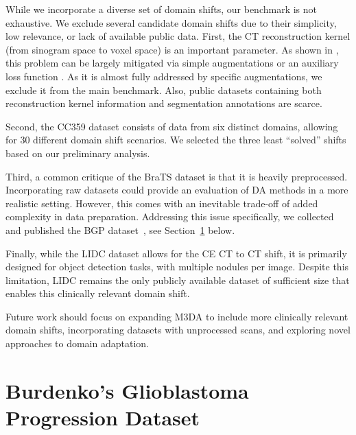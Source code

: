 While we incorporate a diverse set of domain shifts, our benchmark is not exhaustive. We exclude several candidate domain shifts due to their simplicity, low relevance, or lack of available public data. First, the CT reconstruction kernel (from sinogram space to voxel space) is an important parameter. As shown in \cite{saparov2021zero}, this problem can be largely mitigated via simple augmentations or an auxiliary loss function \cite{shimovolos2022adaptation}. As it is almost fully addressed by specific augmentations, we exclude it from the main benchmark. Also, public datasets containing both reconstruction kernel information and segmentation annotations are scarce.

Second, the CC359 dataset consists of data from six distinct domains, allowing for 30 different domain shift scenarios. We selected the three least ``solved'' shifts based on our preliminary analysis.%

Third, a common critique of the BraTS dataset is that it is heavily preprocessed. Incorporating raw datasets could provide an evaluation of DA methods in a more realistic setting. However, this comes with an inevitable trade-off of added complexity in data preparation. Addressing this issue specifically, we collected and published the BGP dataset~\cite{Zolotova2023Burdenko}, see Section~\ref{sec:da_bench:bgpd} below.


Finally, while the LIDC dataset allows for the CE CT to CT shift, it is primarily designed for object detection tasks, with multiple nodules per image. Despite this limitation, LIDC remains the only publicly available dataset of sufficient size that enables this clinically relevant domain shift.

Future work should focus on expanding M3DA to include more clinically relevant domain shifts, incorporating datasets with unprocessed scans, and exploring novel approaches to domain adaptation.


\section{Burdenko's Glioblastoma Progression Dataset}
\label{sec:da_bench:bgpd}

